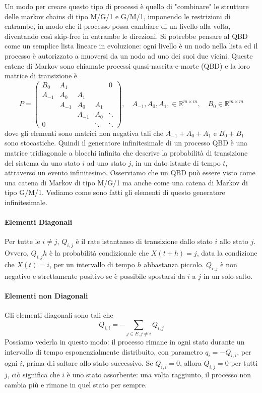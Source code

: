 \documentclass[11pt]{article}
\begin{document}
Un modo per creare questo tipo di processi è quello di "combinare" le strutture delle markov chains di tipo M/G/1 e G/M/1, imponendo le restrizioni di entrambe, in modo che il processo possa cambiare di un livello alla volta, diventando così skip-free in entrambe le direzioni.
Si potrebbe pensare al QBD come un semplice lista lineare in evoluzione: ogni livello è un nodo nella lista ed il processo è autorizzato a muoversi da un nodo ad uno dei suoi due vicini. Queste catene di Markov sono chiamate processi quasi-nascita-e-morte (QBD) e la loro matrice di transizione è
\begin{equation*}
    P=
    \begin{pmatrix}
        B_0 & A_1 & & & 0 \\
        A_{-1} & A_0 & A_1 & & \\
        & A_{-1} & A_0 & A_1 & \\
        & & A_{-1} & A_0 & \ddots \\
        0 & & & \ddots & \ddots
    \end{pmatrix}
    ,\quad A_{-1}, A_0, A_1, \in \mathbb{R}^{m \times m}, \quad B_0 \in \mathbb{R}^{m \times m}
\end{equation*}
dove gli elementi sono matrici non negativa tali che $A_{-1} + A_0 + A_1$ e $B_0 + B_1$ sono stocastiche. Quindi il generatore infinitesimale di un processo QBD è una matrice tridiagonale a blocchi infinita che descrive la probabilità di transizione del sistema da uno stato $i$ ad uno stato $j$, in un dato istante di tempo $t$, attraverso un evento infinitesimo. Osserviamo che un QBD può essere visto come una catena di Markov di tipo M/G/1 ma anche come una catena di Markov di tipo G/M/1. Vediamo come sono fatti gli elementi di questo generatore infinitesimale.

\paragraph{Elementi Diagonali} Per tutte le $i \neq j$, $Q_{i,j}$ è il rate istantaneo di transizione dallo stato $i$ allo stato $j$. Ovvero, $Q_{i,j}h$ è la probabilità condizionale che $X(t + h) = j$, data la condizione che $X(t) = i$, per un intervallo di tempo $h$ abbastanza piccolo.
$Q_{i,j}$ è non negativo e strettamente positivo se è possibile spostarsi da $i$ a $j$ in un solo salto.

\paragraph{Elementi non Diagonali}  Gli elementi diagonali sono tali che
$$Q_{i,i} = - \sum_{j \in E, j \neq i} Q_{i,j}$$
Possiamo vederla in questo modo: il processo rimane in ogni stato durante un intervallo di tempo esponenzialmente distribuito, con parametro $q_i = -Q_{i,i}$, per ogni $i$, prima d.i saltare allo stato successivo. Se $Q_{i,i} = 0$, allora $Q_{i,j} = 0$ per tutti $j$, ciò significa che $i$ è uno stato assorbente: una volta raggiunto, il processo non cambia più e rimane in quel stato per sempre. \\
\end{document}
